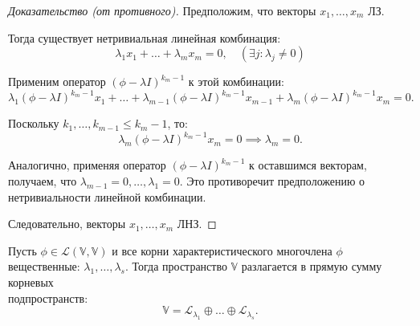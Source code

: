 \begin{proof}[Доказательство (от противного)]

    Предположим, что векторы $x_{1}, \ldots, x_{m}$ ЛЗ. 
    
    Тогда существует нетривиальная линейная комбинация:
    \[
    \lambda_{1} x_{1} + \ldots + \lambda_{m} x_{m} = 0, \quad (\exists j : \lambda_{j} \neq 0)
    \]
   

    Применим оператор $(\phi - \lambda I)^{k_{m} - 1}$ к этой комбинации:
    \[
    \lambda_{1} (\phi - \lambda I)^{k_{m} - 1} x_{1} + \ldots + \lambda_{m-1} (\phi - \lambda I)^{k_{m} - 1} x_{m-1} + \lambda_{m} (\phi - \lambda I)^{k_{m} - 1} x_{m} = 0.
    \]

    Поскольку $k_{1}, \ldots, k_{m-1} \leq k_{m} - 1$, то:
    \[
    \lambda_{m} (\phi - \lambda I)^{k_{m} - 1} x_{m} = 0 \implies \lambda_{m} = 0.
    \]

    Аналогично, применяя оператор $(\phi - \lambda I)^{k_{m} - 1}$ к оставшимся векторам, получаем, что $\lambda_{m-1} = 0, \ldots, \lambda_{1} = 0$. Это противоречит предположению о нетривиальности линейной комбинации.

    Следовательно, векторы $x_{1}, \ldots, x_{m}$ ЛНЗ.
\end{proof}

\vspace{0.3cm}
\begin{shth}
    \begin{theorem}
    \leavevmode \nl 
    
        Пусть $\phi \in \mathcal{L}(\mathbb{V}, \mathbb{V})$ и все корни характеристического многочлена $\phi$ вещественные: $\lambda_{1}, \ldots, \lambda_{s}$. Тогда пространство $\mathbb{V}$ разлагается в прямую сумму корневых \\ подпространств: 
        \[
        \mathbb{V} = \mathcal{L}_{\lambda_{1}} \oplus \ldots \oplus \mathcal{L}_{\lambda_{s}}.
        \]
    \end{theorem}
\end{shth}

